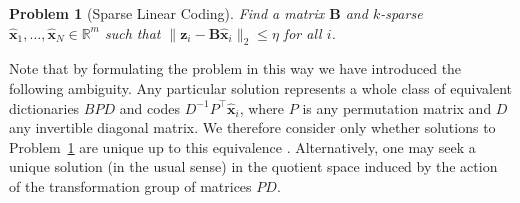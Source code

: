 \documentclass[9pt,twocolumn]{pnas-new}
\newtheorem{problem}{Problem}
\begin{document}
\begin{problem}[Sparse Linear Coding]\label{InverseProblem}
Find a matrix $\mathbf{B}$ and $k$-sparse $\mathbf{\hat x}_1, \ldots, \mathbf{\hat x}_N \in \mathbb{R}^m$ such that $\|\mathbf{z}_i - \mathbf{B}\mathbf{\hat x}_i\|_2 \leq \eta$ for all $i$.
\end{problem}

Note that by formulating the problem in this way we have introduced the following ambiguity. Any particular solution represents a whole class of equivalent dictionaries $BPD$ and codes $D^{-1}P^{\top}\mathbf{\hat x}_i$, where $P$ is any permutation matrix and $D$ any invertible diagonal matrix. We therefore consider only whether solutions to Problem~\ref{InverseProblem} are unique up to this equivalence \cite{Li15}. Alternatively, one may seek a unique solution (in the usual sense) in the quotient space induced by the action of the transformation group of matrices $PD$.
\end{document}
